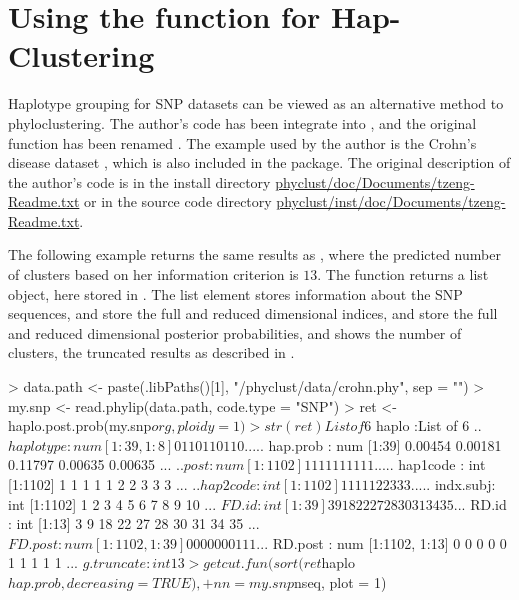 \section[Using the haplo.post.prob() function for Hap-Clustering]{Using the  function for Hap-Clustering}
\label{sec:haplo}

Haplotype grouping \citep{tzeng2005} for SNP datasets
can be viewed as an alternative method to phyloclustering.
The author's  code has been integrate into ,
and the original function has been renamed .
The example used by the author is the Crohn's disease dataset
\citep{Hugot2001}, which is also included in the  package.
The original description of the author's  code is in the
install directory 
\url{phyclust/doc/Documents/tzeng-Readme.txt} or in the source code directory
\url{phyclust/inst/doc/Documents/tzeng-Readme.txt}.

The following example returns the same results as \cite{tzeng2005}, where
the predicted number of clusters based on her information criterion is $13$.
The function returns a list object, here stored in .
The list element  stores information about the SNP sequences,
 and  store the full and reduced dimensional
indices, 
 and  store the full and reduced dimensional
posterior probabilities, and  shows
the number of clusters,
the truncated results as described in \cite{tzeng2005}.
\begin{Code}
> data.path <- paste(.libPaths()[1], "/phyclust/data/crohn.phy", sep = "")
> my.snp <- read.phylip(data.path, code.type = "SNP")
> ret <- haplo.post.prob(my.snp$org, ploidy = 1)
> str(ret)
List of 6
 $ haplo     :List of 6
  ..$ haplotype: num [1:39, 1:8] 0 1 1 0 1 1 0 1 1 0 ...
  ..$ hap.prob : num [1:39] 0.00454 0.00181 0.11797 0.00635 0.00635 ...
  ..$ post     : num [1:1102] 1 1 1 1 1 1 1 1 1 1 ...
  ..$ hap1code : int [1:1102] 1 1 1 1 1 2 2 3 3 3 ...
  ..$ hap2code : int [1:1102] 1 1 1 1 1 2 2 3 3 3 ...
  ..$ indx.subj: int [1:1102] 1 2 3 4 5 6 7 8 9 10 ...
 $ FD.id     : int [1:39] 3 9 18 22 27 28 30 31 34 35 ...
 $ RD.id     : int [1:13] 3 9 18 22 27 28 30 31 34 35 ...
 $ FD.post   : num [1:1102, 1:39] 0 0 0 0 0 0 0 1 1 1 ...
 $ RD.post   : num [1:1102, 1:13] 0 0 0 0 0 1 1 1 1 1 ...
 $ g.truncate: int 13
> getcut.fun(sort(ret$haplo$hap.prob, decreasing = TRUE),
+            nn = my.snp$nseq, plot = 1)
\end{Code}

